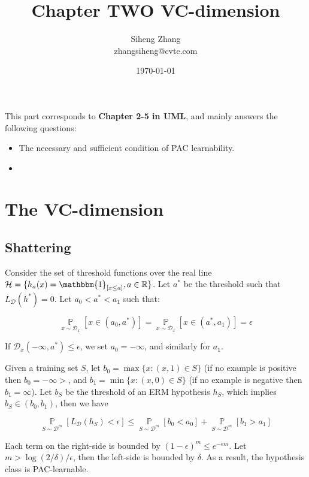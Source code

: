 \documentclass{article}
\author{Siheng Zhang\\zhangsiheng@cvte.com}
\title{Chapter TWO VC-dimension}
\date{\today}
\begin{document}
\maketitle  

This part corresponds to \textbf{Chapter 2-5 in UML}, and mainly answers the following questions:

\begin{itemize}
\item The necessary and sufficient condition of PAC learnability.
\item 
\end{itemize}

\tableofcontents
\newpage

\section{The VC-dimension}

\subsection{Shattering}

Consider the set of threshold functions over the real line $\mathcal{H}=\{h_a(x)=\mathbbm{1}_{[x\leq a]},a\in\mathbb{R}\}$. Let $a^*$ be the threshold such that $L_\mathcal{D}(h^*)=0$. Let $a_0<a^*<a_1$ such that:

\begin{equation*}
\mathop{\mathbb{P}}\limits_{x\sim\mathcal{D}_x}[x\in(a_0,a^*)]=\mathop{\mathbb{P}}\limits_{x\sim\mathcal{D}_x}[x\in(a^*,a_1)]=\epsilon
\end{equation*}

If $\mathcal{D}_x(-\infty,a^*)\leq\epsilon$, we set $a_0=-\infty$, and similarly for $a_1$.

Given a training set $S$, let $b_0=\max\{x:(x,1)\in S\}$ (if no example is positive then $b_0=-\infty>$, and $b_1=\min\{x:(x,0)\in S\}$ (if no example is negative then $b_1=\infty$). Let $b_S$ be the threshold of an ERM hypothesis $h_S$, which implies $b_S\in(b_0,b_1)$, then we have

\begin{equation*}
\mathop{\mathbb{P}}\limits_{S\sim\mathcal{D}^m}[L_\mathcal{D}(h_S)<\epsilon]\leq\mathop{\mathbb{P}}\limits_{S\sim\mathcal{D}^m}[b_0<a_0]+\mathop{\mathbb{P}}\limits_{S\sim\mathcal{D}^m}[b_1>a_1]
\end{equation*}

Each term on the right-side is bounded by $(1-\epsilon)^m\leq e^{-\epsilon m}$. Let $m>\log(2/\delta)/\epsilon$, then the left-side is bounded by $\delta$. As a result, the hypothesis class is PAC-learnable.
\end{document}
